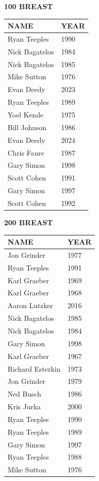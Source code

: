 \begin{table}[H]
\centering
\begin{minipage}[t]{0.48\textwidth}
\centering
\textbf{100 BREAST}\\[0.1cm]
\begin{tabular}{@{}p{2.8cm}p{1.2cm}@{}}
\hline
    \textbf{NAME} & \textbf{YEAR} \\
\hline
    Ryan Teeples & 1990 \\
    Nick Bagatelos & 1984 \\
    Nick Bagatelos & 1985 \\
    Mike Sutton & 1976 \\
    Evan Deedy & 2023 \\
    Ryan Teeples & 1989 \\
    Yoel Kende & 1975 \\
    Bill Johnson & 1986 \\
    Evan Deedy & 2024 \\
    Chris Faure & 1987 \\
    Gary Simon & 1998 \\
    Scott Cohen & 1991 \\
    Gary Simon & 1997 \\
    Scott Cohen & 1992 \\
\hline
\end{tabular}
\end{minipage}\hfill
\begin{minipage}[t]{0.48\textwidth}
\centering
\textbf{200 BREAST}\\[0.1cm]
\begin{tabular}{@{}p{2.8cm}p{1.2cm}@{}}
\hline
    \textbf{NAME} & \textbf{YEAR} \\
\hline
    Jon Grinder & 1977 \\
    Ryan Teeples & 1991 \\
    Karl Graeber & 1969 \\
    Karl Graeber & 1968 \\
    Aaron Lutzker & 2016 \\
    Nick Bagatelos & 1985 \\
    Nick Bagatelos & 1984 \\
    Gary Simon & 1998 \\
    Karl Graeber & 1967 \\
    Richard Esterkin & 1973 \\
    Jon Grinder & 1979 \\
    Ned Busch & 1986 \\
    Kris Jurka & 2000 \\
    Ryan Teeples & 1990 \\
    Ryan Teeples & 1989 \\
    Gary Simon & 1997 \\
    Ryan Teeples & 1988 \\
    Mike Sutton & 1976 \\
\hline
\end{tabular}
\end{minipage}
\end{table}

